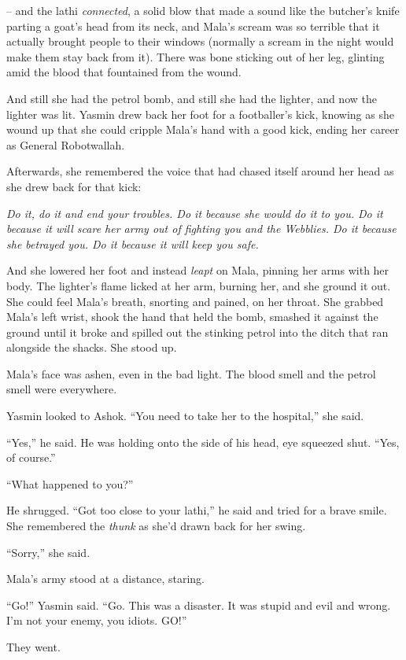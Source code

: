 -- and the lathi \emph{connected}, a solid blow that made a sound
like the butcher's knife parting a goat's head from its neck, and
Mala's scream was so terrible that it actually brought people to
their windows (normally a scream in the night would make them stay
back from it). There was bone sticking out of her leg, glinting
amid the blood that fountained from the wound.

And still she had the petrol bomb, and still she had the lighter,
and now the lighter was lit. Yasmin drew back her foot for a
footballer's kick, knowing as she wound up that she could cripple
Mala's hand with a good kick, ending her career as General
Robotwallah.

Afterwards, she remembered the voice that had chased itself around
her head as she drew back for that kick:

\emph{Do it, do it and end your troubles. Do it because she would do it to you. Do it because it will scare her army out of fighting you and the Webblies. Do it because she betrayed you. Do it because it will keep you safe.}

And she lowered her foot and instead \emph{leapt} on Mala, pinning
her arms with her body. The lighter's flame licked at her arm,
burning her, and she ground it out. She could feel Mala's breath,
snorting and pained, on her throat. She grabbed Mala's left wrist,
shook the hand that held the bomb, smashed it against the ground
until it broke and spilled out the stinking petrol into the ditch
that ran alongside the shacks. She stood up.

Mala's face was ashen, even in the bad light. The blood smell and
the petrol smell were everywhere.

Yasmin looked to Ashok. ``You need to take her to the hospital,'' she
said.

``Yes,'' he said. He was holding onto the side of his head, eye
squeezed shut. ``Yes, of course.''

``What happened to you?''

He shrugged. ``Got too close to your lathi,'' he said and tried for a
brave smile. She remembered the \emph{thunk} as she'd drawn back
for her swing.

``Sorry,'' she said.

Mala's army stood at a distance, staring.

``Go!'' Yasmin said. ``Go. This was a disaster. It was stupid and evil
and wrong. I'm not your enemy, you idiots. GO!''

They went.


